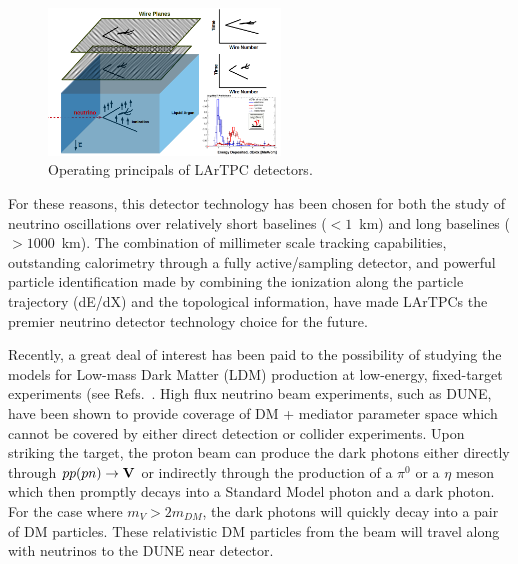 \begin{figure}[htb]
\centering
\includegraphics[width=0.55\textwidth]{images/lartpc.png}
\caption[]{Operating principals of LArTPC detectors.}
\label{fig:LArTPC}
\end{figure}

For these reasons, this detector technology has been chosen for both the study of neutrino oscillations over relatively short baselines ($<1$~km) and long baselines ($>1000$~km). The combination of millimeter scale tracking capabilities, outstanding calorimetry through a fully active/sampling detector, and powerful particle identification made by combining the ionization along the particle trajectory (dE/dX) and the topological information, have made LArTPCs the premier neutrino detector technology choice for the future. 

Recently, a great deal of interest has been paid to the possibility of studying the models for Low-mass Dark Matter (LDM) production at low-energy, fixed-target experiments (see Refs.~\cite{if:ldm-1, if:ldm-2,if:ldm-3, if:ldm-4)}.  High flux neutrino beam experiments, such as DUNE, have been shown to provide coverage of DM + mediator parameter space which cannot be covered by either direct detection or collider experiments. Upon striking the target, the proton beam can produce the dark photons either directly through $pp(pn)\rightarrow \bf {V}$ or indirectly through the production of a $\pi^{0}$ or a $\eta$ meson which then promptly decays into a Standard Model photon and a dark photon. For the case where $m_{V} > 2m_{DM}$, the dark photons will quickly decay into a pair of DM particles.  These relativistic DM particles from the beam will travel along with neutrinos to the DUNE near detector.  

